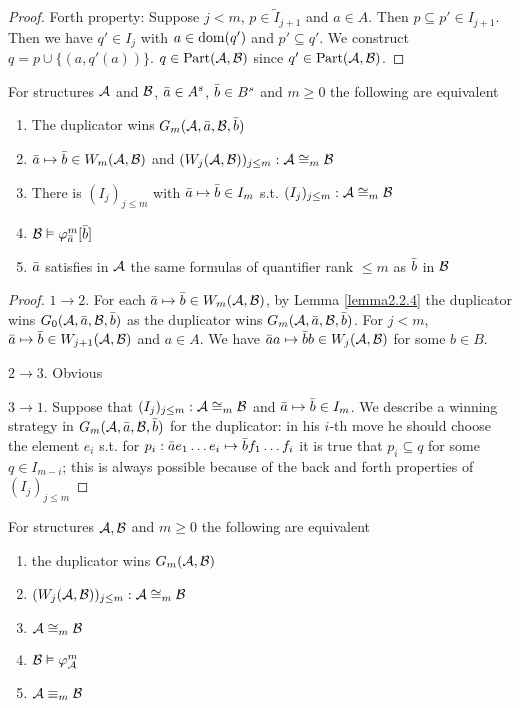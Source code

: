 \documentclass[11pt]{article}
\def \Part {\text{Part}}
\begin{document}
\begin{proof}
Forth property: Suppose \(j<m\), \(p\in \tilde{I}_{j+1}\) and \(a\in A\).
Then \(p\subseteq p'\in I_{j+1}\). Then we have \(q'\in I_{j}\) with \(a\in\operatorname{dom}(q')\)
and \(p'\subseteq q'\). We construct \(q=p\cup\{(a,q'(a))\}\). \(q\in\Part(\cala,\calb)\)
since \(q'\in\Part(\cala,\calb)\).
\end{proof}

\begin{theorem}[]
For structures \(\mathcal{A}\) and \(\mathcal{B}\), \(\bar{a}\in A^s\), \(\bar{b}\in B^s\) and \(m\ge0\) the
following are equivalent
\begin{enumerate}
\item The duplicator wins \(G_m(\mathcal{A},\bar{a},\mathcal{B},\bar{b})\)
\item \(\bar{a}\mapsto\bar{b}\in W_m(\mathcal{A},\mathcal{B})\) and \((W_j(\mathcal{A},\mathcal{B}))_{j\le m}:\mathcal{A}\cong_m\mathcal{B}\)
\item There is \((I_j)_{j\le m}\) with \(\bar{a}\mapsto\bar{b}\in I_m\) s.t. \((I_j)_{j\le m}:\mathcal{A}\cong_m\mathcal{B}\)
\item \(\mathcal{B}\vDash\varphi_{\bar{a}}^m[\bar{b}]\)
\item \(\bar{a}\) satisfies in \(\mathcal{A}\) the same formulas of quantifier rank \(\le m\) as \(\bar{b}\)
in \(\mathcal{B}\)
\end{enumerate}
\end{theorem}

\begin{proof}
\(1\to2\). For each \(\bar{a}\mapsto\bar{b}\in W_m(\mathcal{A},\mathcal{B})\), by Lemma \ref{lemma2.2.4} the
duplicator wins \(G_0(\mathcal{A},\bar{a},\mathcal{B},\bar{b})\) as the duplicator wins
\(G_m(\mathcal{A},\bar{a},\mathcal{B},\bar{b})\). For \(j<m\), \(\bar{a}\mapsto\bar{b}\in W_{j+1}(\mathcal{A},\mathcal{B})\)
and \(a\in A\). We have \(\bar{a} a\mapsto\bar{b} b\in W_j(\mathcal{A},\mathcal{B})\) for some \(b\in B\).

\(2\to 3\). Obvious

\(3\to1\). Suppose that \((I_j)_{j\le m}:\mathcal{A}\cong_m\mathcal{B}\) and \(\bar{a}\mapsto\bar{b}\in I_m\). We
describe a winning strategy in \(G_m(\mathcal{A},\bar{a},\mathcal{B},\bar{b})\) for the duplicator: in his
\(i\)-th move he should choose the element \(e_i\) s.t. for
\(p_i:\bar{a} e_1\dots e_i\mapsto\bar{b} f_1\dots f_i\) it is true that \(p_i\subseteq q\) for some
\(q\in I_{m-i}\); this is always possible because of the back and forth properties of
\((I_j)_{j\le m}\)
\end{proof}

\begin{corollary}[]
For structures \(\mathcal{A}, \mathcal{B}\) and \(m\ge0\) the following are equivalent
\begin{enumerate}
\item the duplicator wins \(G_m(\mathcal{A},\mathcal{B})\)
\item \((W_j(\mathcal{A},\mathcal{B}))_{j\le m}:\mathcal{A}\cong_m\mathcal{B}\)
\item \(\mathcal{A}\cong_m\mathcal{B}\)
\item \(\mathcal{B}\vDash\varphi_{\mathcal{A}}^m\)
\item \(\mathcal{A}\equiv_m\mathcal{B}\)
\end{enumerate}
\end{corollary}
\end{document}
